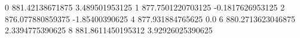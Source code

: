 0 881.42138671875 3.489501953125
1 877.7501220703125 -0.1817626953125
2 876.077880859375 -1.85400390625
4 877.931884765625 0.0
6 880.2713623046875 2.3394775390625
8 881.8611450195312 3.92926025390625
